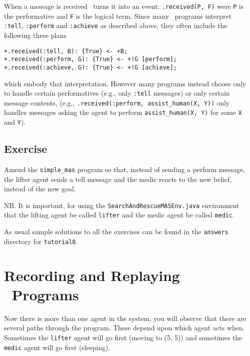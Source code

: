 \begin{sloppypar}
When a message is received \gwendolen\ turns it into an event: \texttt{.received(P,~F)} were \texttt{P} is the performative and \texttt{F} is the logical term.  Since many \gwendolen\ programs interpret \texttt{:tell}, \texttt{:perform} and \texttt{:achieve} as described above, they often include the following three plans 
\end{sloppypar}
\begin{verbatim}
+.received(:tell, B): {True} <- +B;
+.received(:perform, G): {True} <- +!G [perform];
+.received(:achieve, G): {True} <- +!G [achieve];
\end{verbatim}
which embody that interpretation.  However many programs instead choose only to handle certain performatives (e.g., only \texttt{:tell} messages) or only certain message contents, (e.g., \texttt{.received(:perform, assist\_human(X, Y))} only handles messages asking the agent to perform \texttt{assist\_human(X, Y)} for some \texttt{X} and \texttt{Y}).

\subsection{Exercise}
Amend the \texttt{simple\_mas} program so that, instead of sending a perform message, the lifter agent sends a tell message and the medic reacts to the new belief, instead of the new goal.

NB. It is important, for using the \texttt{SearchAndRescueMASEnv.java} environment that the lifting agent be called \texttt{lifter} and the medic agent be called \texttt{medic}.

As usual sample solutions to all the exercises can be found in the \texttt{answers} directory for \texttt{tutorial8}.

\section{Recording and Replaying \ail\ Programs}
Now there is more than one agent in the system, you will observe that there are several paths through the program.  These depend upon which agent acts when.  Sometimes the \texttt{lifter} agent will go first (moving to (5, 5)) and sometimes the \texttt{medic} agent will go first (sleeping).


